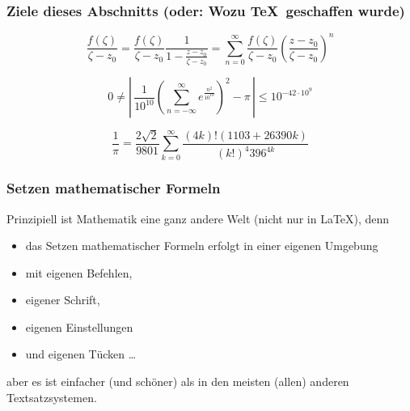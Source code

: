
\subtitle{Setzen Mathematischer Formeln}
\date{2017-05-02}


  \DeclareMathOperator{\id}{id}
  \newcommand{\supp}{\operatorname{supp}}
  \newcommand{\llim}{L_2\operatorname*{-lim}}



\begin{frame}
  \frametitle{Ziele dieses Abschnitts (oder: Wozu \TeX\ geschaffen wurde)}

  \onslide<+->

  \begin{equation*}
    \frac{f\left(\zeta\right)}{\zeta-z_0} = \frac{f\left(\zeta\right)}
    {\zeta-z_0}\frac{1}{
      1-\frac{z-z_0}{\zeta-z_0}} = \sum_{n=0}^{\infty}\frac{f\left(\zeta\right)}
    {\zeta-z_0}
    \left(\frac{z-z_0}{\zeta-z_0}\right)^n
  \end{equation*}

  \medskip

  \begin{equation*}
    0 \neq \left|\, \frac{1}{10^{10}} \left( \sum_{n = -\infty}^{\infty}
        e^{\frac{n^2}{10^{10}}} \right)^2 - \pi \,\right|
    \le 10^{-42 \cdot 10^9}
  \end{equation*}

  \medskip

  \begin{equation*}
    \frac{1}{\pi} = \frac{2\sqrt{2}}{9801} \sum^\infty_{k=0} \frac{(4k)!(1103+26390k)}{(k!)^4 396^{4k}}
  \end{equation*}

\end{frame}

\begin{frame}
  \frametitle{Setzen mathematischer Formeln}

  \onslide<+->

  Prinzipiell ist Mathematik eine ganz andere Welt (nicht nur in \LaTeX), denn
  \begin{itemize}
  \item<+-> das Setzen mathematischer Formeln erfolgt in einer eigenen Umgebung
  \item<+-> mit eigenen Befehlen,
  \item<+-> eigener Schrift,
  \item<+-> eigenen Einstellungen
  \item<+-> und eigenen Tücken \dots
  \end{itemize}

  \onslide<+->

  aber es ist einfacher (und schöner) als in den meisten (allen) anderen Textsatzsystemen.
\end{frame}

